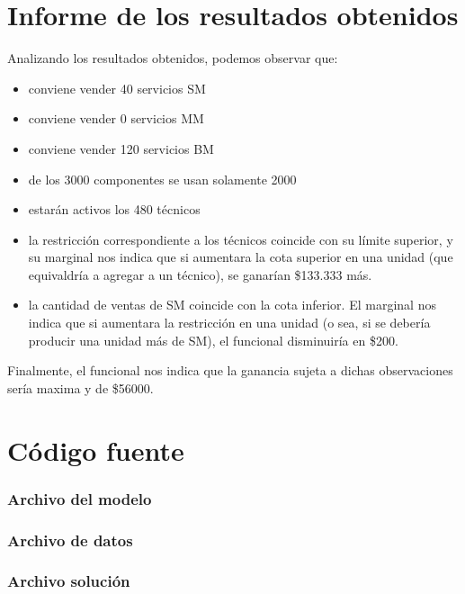 \documentclass{article}
\begin{document}
\part{Informe de los resultados obtenidos}
Analizando los resultados obtenidos, podemos observar que:
\begin{itemize}
	\item conviene vender 40 servicios SM
	\item conviene vender 0 servicios MM
	\item conviene vender 120 servicios BM
	\item de los 3000 componentes se usan solamente 2000
	\item estar\'an activos los 480 t\'ecnicos
	\item la restricci\'on correspondiente a los t\'ecnicos coincide con su l\'imite superior, y su marginal nos indica que si aumentara la cota superior en una unidad (que equivaldr\'ia a agregar a un t\'ecnico), se ganar\'ian \$133.333 m\'as. 
	\item la cantidad de ventas de SM coincide con la cota inferior. El marginal nos indica que si aumentara la restricci\'on en una unidad (o sea, si se deber\'ia producir una unidad m\'as de SM), el funcional disminuir\'ia en \$200.
\end{itemize}
Finalmente, el funcional nos indica que la ganancia sujeta a dichas observaciones ser\'ia maxima y de \$56000.


\newpage
\part{C\'odigo fuente}
\section{Archivo del modelo}


\section{Archivo de datos}


\lstset{
	  basicstyle=\ttfamily,
}
\section{Archivo soluci\'on}

\end{document}
